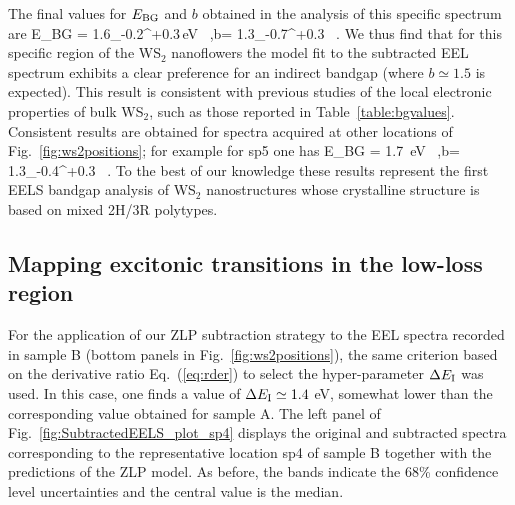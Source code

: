 The final values for $E_{\rm BG}$ and $b$ obtained in the analysis of this specific spectrum are
\be
E_{\rm BG} = 1.6_{-0.2}^{+0.3}\,{\rm eV} \, ,\quad b= 1.3_{-0.7}^{+0.3} \, .
\ee
We thus find that for this specific region of the WS$_2$ nanoflowers
the model fit to the subtracted EEL spectrum exhibits a clear preference
for an indirect bandgap (where $b\simeq 1.5$ is expected).
%
This result is consistent with previous studies of the local
electronic properties of bulk WS$_2$, such as those reported in Table~\ref{table:bgvalues}.
%
Consistent results are obtained for spectra acquired at
other locations of Fig.~\ref{fig:ws2positions}; for example for sp5 one has
\be
E_{\rm BG} = 1.7 \,{\rm eV} \, ,\quad b= 1.3_{-0.4}^{+0.3} \, .
\ee
%
To the best of our knowledge
these results represent the first EELS bandgap analysis of WS$_2$ nanostructures
whose crystalline structure is based on mixed 2H/3R polytypes.

\subsection{Mapping excitonic transitions in the low-loss region}

For the application of our ZLP subtraction strategy to the EEL spectra recorded in sample B (bottom panels
in  Fig.~\ref{fig:ws2positions}), the same criterion
based on the derivative ratio Eq.~(\ref{eq:rder}) to select the hyper-parameter $\Delta E_{\rm I}$ was
used.
%
In this case, one finds a value of $\Delta E_{\rm I}\simeq 1.4$ eV,
 somewhat lower than the corresponding value obtained for sample A.
%
The left panel of Fig.~\ref{fig:SubtractedEELS_plot_sp4} displays
the original
and subtracted spectra corresponding to the representative
location sp4 of sample B
together with the predictions of the ZLP model.
%
As before, the bands indicate the 68\% confidence level uncertainties
and the central value is the median.

